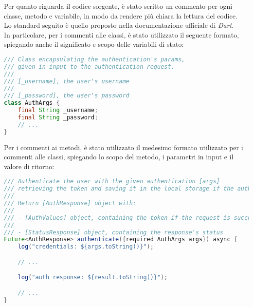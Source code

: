 Per quanto riguarda il codice sorgente, è stato scritto un commento per ogni classe, metodo e variabile, in modo da rendere più chiara la lettura del codice.\\
Lo standard seguito è quello proposto nella documentazione ufficiale di \emph{Dart}\cite{site:comment}. \\

In particolare, per i commenti alle classi, è stato utilizzato il seguente formato, spiegando anche il significato e scopo delle variabili di stato:
\begin{lstlisting}[language=Java, caption={Commento classe}, captionpos=b]
/// Class encapsulating the authentication's params,
/// given in input to the authentication request.
///
/// [_username], the user's username
///
/// [_password], the user's password
class AuthArgs {
    final String _username;
    final String _password;
    // ...
}
\end{lstlisting}

Per i commenti ai metodi, è stato utilizzato il medesimo formato utilizzato per i commenti alle classi, spiegando lo scopo del metodo, i parametri in input e il valore di ritorno:
\begin{lstlisting}[language=Java, caption={Commento metodo}, captionpos=b]
/// Authenticate the user with the given authentication [args]
/// retrieving the token and saving it in the local storage if the authentication request is successful.
///
/// Return [AuthResponse] object with:
///
/// - [AuthValues] object, containing the token if the request is successful
///
/// - [StatusResponse] object, containing the response's status
Future<AuthResponse> authenticate({required AuthArgs args}) async {
    log("credentials: ${args.toString()}");

    // ...

    log("auth response: ${result.toString()}");

    // ...
}
\end{lstlisting}
